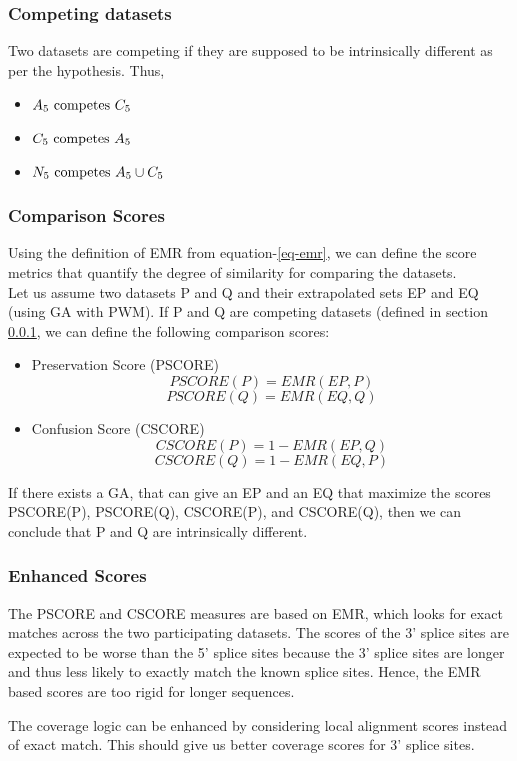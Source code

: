 \documentclass[12pt,a4paper]{article}
\begin{document}
	\subsubsection{Competing datasets} \label{sec:competing}
	Two datasets are competing if they are supposed to be intrinsically different as per the hypothesis.
	Thus,
	\begin{itemize}
	\item $A_5 \textnormal{ competes } C_5$
	\item $C_5 \textnormal{ competes } A_5$
	\item $N_5 \textnormal{ competes } A_5 \cup C_5$
	\end{itemize}

	\subsubsection{Comparison Scores} \label{scores}
	Using the definition of EMR from equation-\ref{eq-emr}, we can define the score metrics that quantify the degree of similarity for comparing the datasets.\\
	Let us assume two datasets P and Q and their extrapolated sets EP and EQ (using GA with PWM). If P and Q are competing datasets (defined in section \ref{sec:competing}, we can define the following comparison scores:
	\begin{itemize}
		\item Preservation Score (PSCORE)
		\begin{equation}
			PSCORE(P) = EMR(EP, P)
			\label{eq-pscore}
		\end{equation}
		\begin{equation}
			PSCORE(Q) = EMR(EQ, Q)
		\end{equation}
		\item Confusion Score (CSCORE)
		\begin{equation}
			CSCORE(P) = 1 - EMR(EP, Q)
			\label{eq-cscore}
		\end{equation}
		\begin{equation}
			CSCORE(Q) = 1 - EMR(EQ, P)
		\end{equation}
	\end{itemize}
	If there exists a GA, that can give an EP and an EQ that maximize the scores PSCORE(P), PSCORE(Q), CSCORE(P), and CSCORE(Q), then we can conclude that P and Q are intrinsically different.
	
	\subsubsection{Enhanced Scores} \label{score-enhanced}
	The PSCORE and CSCORE measures are based on EMR, which looks for exact matches across the two participating datasets. The scores of the 3' splice sites are expected to be worse than the 5' splice sites because the 3' splice sites are longer and thus less likely to exactly match the known splice sites. Hence, the EMR based scores are too rigid for longer sequences. \par
	The coverage logic can be enhanced by considering local alignment scores instead of exact match. This should give us better coverage scores for 3' splice sites.
		
\end{document}
